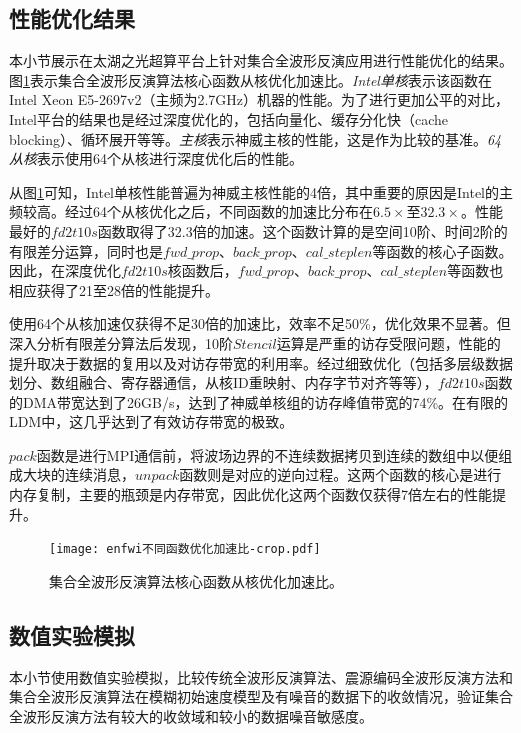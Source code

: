 \subsection{性能优化结果}

本小节展示在太湖之光超算平台上针对集合全波形反演应用进行性能优化的结果。图\ref{fig:集合全波形反演算法核心函数从核优化加速比}表示集合全波形反演算法核心函数从核优化加速比。\emph{Intel单核}表示该函数在Intel Xeon E5-2697v2（主频为2.7GHz）机器的性能。为了进行更加公平的对比，Intel平台的结果也是经过深度优化的，包括向量化、缓存分化快（cache blocking）、循环展开等等。\emph{主核}表示神威主核的性能，这是作为比较的基准。\emph{64从核}表示使用64个从核进行深度优化后的性能。

从图\ref{fig:集合全波形反演算法核心函数从核优化加速比}可知，Intel单核性能普遍为神威主核性能的4倍，其中重要的原因是Intel的主频较高。经过64个从核优化之后，不同函数的加速比分布在$6.5\times$至$32.3\times$。性能最好的$fd2t10s$函数取得了32.3倍的加速。这个函数计算的是空间10阶、时间2阶的有限差分运算，同时也是$fwd\_prop$、$back\_prop$、$cal\_steplen$等函数的核心子函数。因此，在深度优化$fd2t10s$核函数后，$fwd\_prop$、$back\_prop$、$cal\_steplen$等函数也相应获得了21至28倍的性能提升。

使用64个从核加速仅获得不足30倍的加速比，效率不足50\%，优化效果不显著。但深入分析有限差分算法后发现，10阶$Stencil$运算是严重的访存受限问题，性能的提升取决于数据的复用以及对访存带宽的利用率。经过细致优化（包括多层级数据划分、数组融合、寄存器通信，从核ID重映射、内存字节对齐等等），$fd2t10s$函数的DMA带宽达到了26GB/s，达到了神威单核组的访存峰值带宽的74\%。在有限的LDM中，这几乎达到了有效访存带宽的极致。

$pack$函数是进行MPI通信前，将波场边界的不连续数据拷贝到连续的数组中以便组成大块的连续消息，$unpack$函数则是对应的逆向过程。这两个函数的核心是进行内存复制，主要的瓶颈是内存带宽，因此优化这两个函数仅获得7倍左右的性能提升。

\begin{figure}[ht]
\centering
\texttt{[image: enfwi不同函数优化加速比-crop.pdf]}
\caption{集合全波形反演算法核心函数从核优化加速比。}
\label{fig:集合全波形反演算法核心函数从核优化加速比}
\end{figure}


\subsection{数值实验模拟}
本小节使用数值实验模拟，比较传统全波形反演算法、震源编码全波形反演方法和集合全波形反演算法在模糊初始速度模型及有噪音的数据下的收敛情况，验证集合全波形反演方法有较大的收敛域和较小的数据噪音敏感度。

